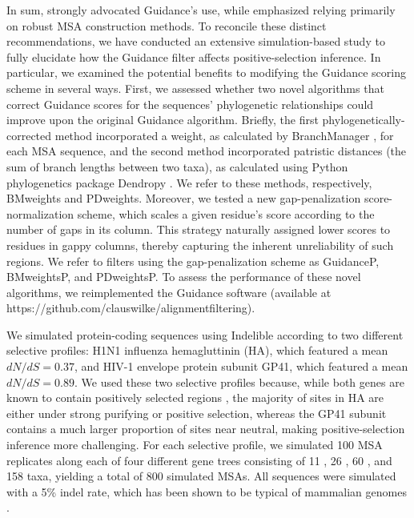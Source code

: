 \documentclass[11pt]{article}
\begin{document}
In sum, \citet{Privman2012} strongly advocated Guidance's use, while \citet{Jordan2012} emphasized relying primarily on robust MSA construction methods. To reconcile these distinct recommendations, we have conducted an extensive simulation-based study to fully elucidate how the Guidance filter affects positive-selection inference. In particular, we examined the potential benefits to modifying the Guidance scoring scheme in several ways.  First, we assessed whether two novel algorithms that correct Guidance scores for the sequences' phylogenetic relationships could improve upon the original Guidance algorithm. Briefly, the first phylogenetically-corrected method incorporated a weight, as calculated by BranchManager \citep{Stone2007}, for each MSA sequence, and the second method incorporated patristic distances (the sum of branch lengths between two taxa), as calculated using Python phylogenetics package Dendropy \citep{Sukumaran2010}. We refer to these methods, respectively, BMweights and PDweights. Moreover, we tested a new gap-penalization score-normalization scheme, which scales a given residue's score according to the number of gaps in its column. This strategy naturally assigned lower scores to residues in gappy columns, thereby capturing the inherent unreliability of such regions. We refer to filters using the gap-penalization scheme as GuidanceP, BMweightsP, and PDweightsP. To assess the performance of these novel algorithms, we reimplemented the Guidance software (available at https://github.com/clauswilke/alignment\underline{\hspace*{0.2cm}}filtering). 

We simulated protein-coding sequences using Indelible \citep{Fletcher2009} according to two different selective profiles: H1N1 influenza hemagluttinin (HA), which featured a mean $dN/dS = 0.37$, and HIV-1 envelope protein subunit GP41, which featured a mean $dN/dS = 0.89$. We used these two selective profiles because, while both genes are known to contain positively selected regions \citep{Bush1999, Frost2001, Bandawe2008, Meyer2012}, the majority of sites in HA are either under strong purifying or positive selection, whereas the GP41 subunit contains a much larger proportion of sites near neutral, making positive-selection inference more challenging. For each selective profile, we simulated 100 MSA replicates along each of four different gene trees consisting of 11 \citep{Spielman2013}, 26 \citep{Spielman2013}, 60 \citep{Yang2011}, and 158 \citep{Betancur2013} taxa, yielding a total of 800 simulated MSAs. All sequences were simulated with a 5\% indel rate, which has been shown to be typical of mammalian genomes \citep{Cooper2004}.
\end{document}
